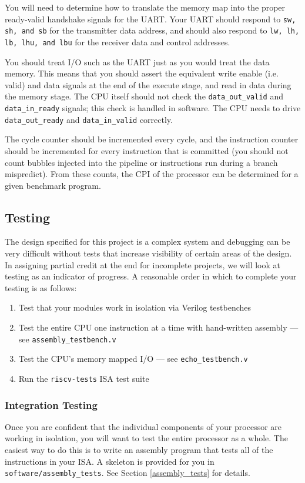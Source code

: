 \documentclass[11pt]{article}
\begin{document}
You will need to determine how to translate the memory map into the proper ready-valid handshake signals for the UART.
Your UART should respond to \verb|sw, sh, and sb| for the transmitter data address, and should also respond to \verb|lw, lh, lb, lhu, and lbu| for the receiver data and control addresses.

You should treat I/O such as the UART just as you would treat the data memory.
This means that you should assert the equivalent write enable (i.e. valid) and data signals at the end of the execute stage, and read in data during the memory stage.
The CPU itself should not check the \verb|data_out_valid| and \verb|data_in_ready| signals; this check is handled in software.
The CPU needs to drive \verb|data_out_ready| and \verb|data_in_valid| correctly.

The cycle counter should be incremented every cycle, and the instruction counter should be incremented for every instruction that is committed (you should not count bubbles injected into the pipeline or instructions run during a branch mispredict).
From these counts, the CPI of the processor can be determined for a given benchmark program.

\subsection{Testing}
\label{testing}
The design specified for this project is a complex system and debugging can be very difficult without tests that increase visibility of certain areas of the design.
In assigning partial credit at the end for incomplete projects, we will look at testing as an indicator of progress.
A reasonable order in which to complete your testing is as follows:

\begin{enumerate}
  \item Test that your modules work in isolation via Verilog testbenches
  \item Test the entire CPU one instruction at a time with hand-written assembly --- see \verb|assembly_testbench.v|
  \item Test the CPU's memory mapped I/O --- see \verb|echo_testbench.v|
  \item Run the \verb|riscv-tests| ISA test suite
\end{enumerate}

\subsubsection{Integration Testing}
Once you are confident that the individual components of your processor are working in isolation, you will want to test the entire processor as a whole. The easiest way to do this is to write an assembly program that tests all of the instructions in your ISA.
A skeleton is provided for you in \verb|software/assembly_tests|.
See Section \ref{assembly_tests} for details.
\end{document}
